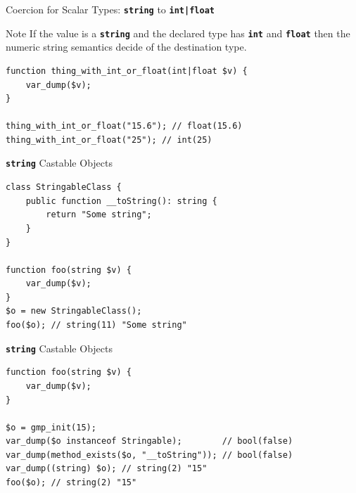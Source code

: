 \documentclass[aspectratio=169]{beamer}
\newcommand{\type}[1]{\texttt{\textbf{#1}}}
\begin{document}
\begin{frame}[fragile]{Coercion for Scalar Types: \type{string} to \type{int|float}}
    \begin{exampleblock}{Note}
       If the value is a \type{string} and the declared type has \type{int} and \type{float} then the numeric string semantics decide of the destination type.
        \begin{verbatim}
function thing_with_int_or_float(int|float $v) {
    var_dump($v);
}
    
thing_with_int_or_float("15.6"); // float(15.6)
thing_with_int_or_float("25"); // int(25)
        \end{verbatim}
    \end{exampleblock}
\end{frame}

\begin{frame}[fragile]{\type{string} Castable Objects}
    \begin{verbatim}
class StringableClass {
    public function __toString(): string {
        return "Some string";
    }
}

function foo(string $v) {
    var_dump($v);
}
$o = new StringableClass();
foo($o); // string(11) "Some string"
    \end{verbatim}
\end{frame}
\begin{frame}[fragile]{\type{string} Castable Objects}
    \begin{verbatim}
function foo(string $v) {
    var_dump($v);
}

$o = gmp_init(15);
var_dump($o instanceof Stringable);        // bool(false)
var_dump(method_exists($o, "__toString")); // bool(false)
var_dump((string) $o); // string(2) "15"
foo($o); // string(2) "15"
    \end{verbatim}
\end{frame}
\end{document}
